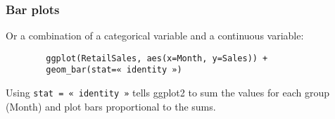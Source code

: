 \documentclass{beamer}
\begin{document}
	\begin{frame}[fragile]
		\frametitle{Bar plots}

		Or a combination of a categorical variable and a continuous variable:

		\begin{exampleblock}{}
		\begin{center}
		\begin{BVerbatim}
		ggplot(RetailSales, aes(x=Month, y=Sales)) + 
		geom_bar(stat=« identity »)
		\end{BVerbatim}
		\end{center}
		\end{exampleblock}{}

		Using \verb|stat = « identity »| tells ggplot2 to sum the values for each group (Month) and plot bars proportional to the sums.
		
	\end{frame}
\end{document}
